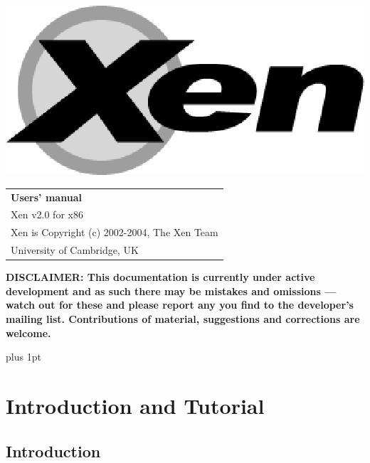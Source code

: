\documentclass[11pt,twoside,final,openright]{report}
\begin{document}
\pagestyle{empty}
\begin{center}
\vspace*{\fill}
\includegraphics{figs/xenlogo.eps}
\vfill
\vfill
\vfill
\begin{tabular}{l}
{\Huge \bf Users' manual} \\[4mm]
{\huge Xen v2.0 for x86} \\[80mm]

{\Large Xen is Copyright (c) 2002-2004, The Xen Team} \\[3mm]
{\Large University of Cambridge, UK} \\[20mm]
\end{tabular}
\end{center}

{\bf
DISCLAIMER: This documentation is currently under active development
and as such there may be mistakes and omissions --- watch out for
these and please report any you find to the developer's mailing list.
Contributions of material, suggestions and corrections are welcome.
}

\vfill
\cleardoublepage

\pagestyle{plain}
{ \parskip 0pt plus 1pt
  \tableofcontents }
\cleardoublepage

\raggedbottom
{}
\parindent=0pt
\parskip=5pt
\renewcommand{\topfraction}{.8}
\renewcommand{\bottomfraction}{.8}
\renewcommand{\textfraction}{.2}
\renewcommand{\floatpagefraction}{.8}

\part{Introduction and Tutorial}
\chapter{Introduction}
\end{document}
